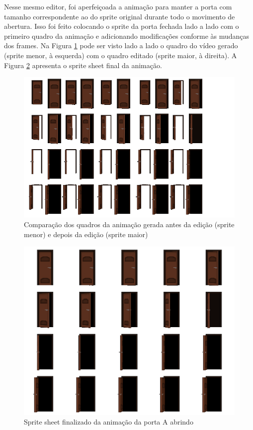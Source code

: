 Nesse mesmo editor, foi aperfeiçoada a animação para manter a porta com tamanho correspondente ao do sprite original durante todo o movimento de abertura. Isso foi feito colocando o sprite da porta fechada lado a lado com o primeiro quadro da animação e adicionando modificações conforme às mudanças dos frames. Na Figura \ref{fig:geminiProPortaASpriteSheetAjuste} pode ser visto lado a lado o quadro do vídeo gerado (sprite menor, à esquerda) com o quadro editado (sprite maior, à direita). A Figura \ref{fig:geminiProPortaASpriteSheetFinal} apresenta o sprite sheet final da animação.

\begin{figure}[htbp]
    \centering
    \caption{\small Comparação dos quadros da animação gerada antes da edição (sprite menor) e depois da edição (sprite maior)}
    \label{fig:geminiProPortaASpriteSheetAjuste}
    \includegraphics[width=0.8\linewidth]{figs/geminiPro/sprite sheet/door_ajuste.png}
\end{figure}

\begin{figure}[htbp]
    \centering
    \caption{\small Sprite sheet finalizado da animação da porta A abrindo}
    \label{fig:geminiProPortaASpriteSheetFinal}
    \includegraphics[width=0.8\linewidth]{figs/geminiPro/sprite sheet/door_pixel_correcao.png}
\end{figure}

